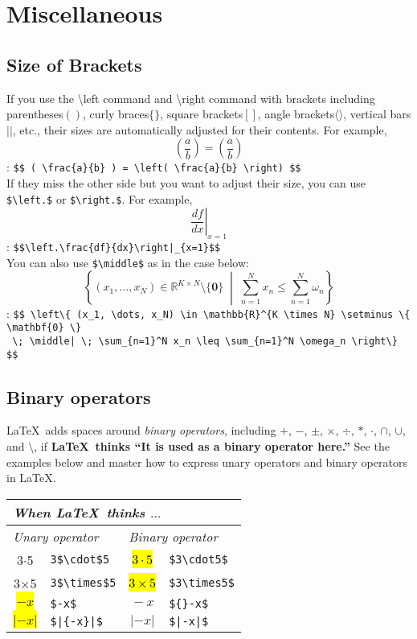 \documentclass[a4paper]{article}
\begin{document}
\section*{Miscellaneous}
\subsection*{\scsnowman Size of Brackets}
If you use the \textbackslash left command and \textbackslash right command with brackets including parentheses$()$, curly braces$\{\}$, square brackets$[]$, angle brackets$\langle \rangle$, vertical bars$||$, etc., their sizes are automatically adjusted for their contents. For example,
$$ ( \frac{a}{b} ) = \left( \frac{a}{b} \right) $$
: \verb+$$ ( \frac{a}{b} ) = \left( \frac{a}{b} \right) $$+\\

If they miss the other side but you want to adjust their size, you can use \verb|$\left.$| or  \verb|$\right.$|. For example,
$$\left.\frac{df}{dx}\right|_{x=1}$$
: \verb+$$\left.\frac{df}{dx}\right|_{x=1}$$+\\

You can also use \verb|$\middle$| as in the case below:
$$ \left\{ (x_1, \dots, x_N) \in \mathbb{R}^{K \times N} \setminus \{ \mathbf{0} \} \; \middle| \; \sum_{n=1}^N x_n \leq \sum_{n=1}^N \omega_n \right\} $$
: \verb+$$ \left\{ (x_1, \dots, x_N) \in \mathbb{R}^{K \times N} \setminus \{ \mathbf{0} \}+ \\
\verb+ \; \middle| \; \sum_{n=1}^N x_n \leq \sum_{n=1}^N \omega_n \right\} $$+

\subsection*{\scsnowman[hat] Binary operators}
\LaTeX\ adds spaces around \textit{binary operators}, including $+$, $-$, $\pm$, $\times$, $\div$, $*$, $\cdot$, $\cap$, $\cup$, and $\setminus$, if \textbf{\LaTeX\ thinks ``It is used as a binary operator here.''} See the examples below and master how to express unary operators and binary operators in \LaTeX.

\vspace{0.5\baselineskip}

\noindent \begin{tabular}{|c|l|c|l|} \hline
    \multicolumn{4}{|l|}{\textit{When \LaTeX\ thinks $\dots$}} \\ \hline
    \multicolumn{2}{|l|}{\textit{Unary operator}} & \multicolumn{2}{|l|}{\textit{Binary operator}} \\ \hline
    3$\cdot$5 & \verb|3$\cdot$5| & \hl{$3\cdot5$} & \verb|$3\cdot5$| \\
    3$\times$5 & \verb|3$\times$5| & \hl{$3\times5$} & \verb|$3\times5$| \\
    \hl{$-x$} & \verb|$-x$| & ${}-x$ & \verb|${}-x$| \\
    \hl{$|{-x}|$} & \verb+$|{-x}|$+ & $|-x|$ & \verb+$|-x|$+\\ \hline
\end{tabular}
\end{document}
